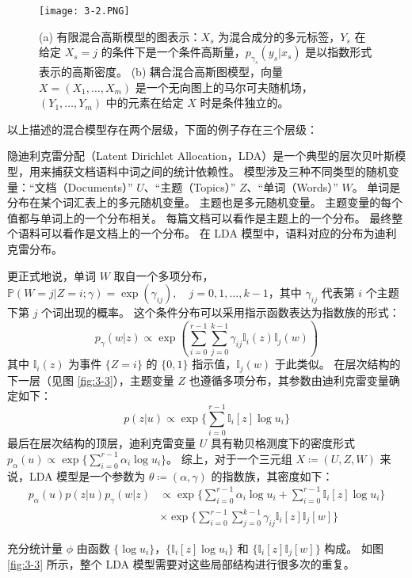\begin{figure}[htbp]
    \centering
    \texttt{[image: 3-2.PNG]}
    \caption{
        (a) 有限混合高斯模型的图表示：$X_s$ 为混合成分的多元标签，$Y_s$ 在给定 $X_s = j$ 的条件下是一个条件高斯量，$p_{\gamma_s}(y_s|x_s)$ 是以指数形式表示的高斯密度。
        (b) 耦合混合高斯图模型，向量 $X = (X_1, \dots, X_m)$ 是一个无向图上的马尔可夫随机场，$(Y_1, \dots, Y_m)$ 中的元素在给定 $X$ 时是条件独立的。
    }\label{fig:3-2}
\end{figure}

以上描述的混合模型存在两个层级，下面的例子存在三个层级：

\begin{tcolorbox}
\begin{exam}[隐迪利克雷分配]

隐迪利克雷分配（Latent Dirichlet Allocation，LDA）是一个典型的层次贝叶斯模型，用来捕获文档语料中词之间的统计依赖性。
模型涉及三种不同类型的随机变量：“文档（Documents）” $U$、“主题（Topics）” $Z$、“单词（Words）” $W$。
单词是分布在某个词汇表上的多元随机变量。
主题也是多元随机变量。
主题变量的每个值都与单词上的一个分布相关。
每篇文档可以看作是主题上的一个分布。
最终整个语料可以看作是文档上的一个分布。
在 LDA 模型中，语料对应的分布为迪利克雷分布。

更正式地说，单词 $W$ 取自一个多项分布，$\mathbb{P}(W = j|Z = i; \gamma) = \exp(\gamma_{ij}), \quad j = 0, 1, \dots, k-1$，其中 $\gamma_{ij}$ 代表第 $i$ 个主题下第 $j$ 个词出现的概率。
这个条件分布可以采用指示函数表达为指数族的形式：
\begin{equation}
    p_{\gamma}(w|z) \propto \exp(\sum_{i = 0}^{r-1}\sum_{j = 0}^{k-1}\gamma_{ij}\mathbb{I}_i(z)\mathbb{I}_j(w))
\end{equation}
其中 $\mathbb{I}_i(z)$ 为事件 $\{Z = i\}$ 的 $\{0, 1\}$ 指示值，$\mathbb{I}_j(w)$ 于此类似。
在层次结构的下一层（见图 \ref{fig:3-3}），主题变量 $Z$ 也遵循多项分布，其参数由迪利克雷变量确定如下：
\begin{equation}
    p(z|u) \propto \exp\{\sum_{i = 0}^{r-1}\mathbb{I}_i[z]\log u_i\}
\end{equation}
最后在层次结构的顶层，迪利克雷变量 $U$ 具有勒贝格测度下的密度形式 $p_{\alpha}(u) \propto \exp\{\sum_{i = 0}^{r-1}\alpha_i\log u_i\}$。
综上，对于一个三元组 $X \coloneqq (U, Z, W)$ 来说，LDA 模型是一个参数为 $\theta \coloneqq (\alpha, \gamma)$ 的指数族，其密度如下：
\begin{align}
    p_{\alpha}(u)p(z|u)p_{\gamma}(w|z) &\propto \exp\{\sum_{i = 0}^{r-1}\alpha_i\log u_i + \sum_{i = 0}^{r-1}\mathbb{I}_i[z]\log u_i\} \nonumber \\
    &\times \exp\{\sum_{i = 0}^{r-1}\sum_{j = 0}^{k-1}\gamma_{ij}\mathbb{I}_i[z]\mathbb{I}_j[w]\}
\end{align}

充分统计量 $\phi$ 由函数 $\{\log u_i\}$，$\{\mathbb{I}_i[z]\log u_i\}$ 和 $\{\mathbb{I}_i[z]\mathbb{I}_j[w]\}$ 构成。
如图 \ref{fig:3-3} 所示，整个 LDA 模型需要对这些局部结构进行很多次的重复。

\end{exam}
\end{tcolorbox}

